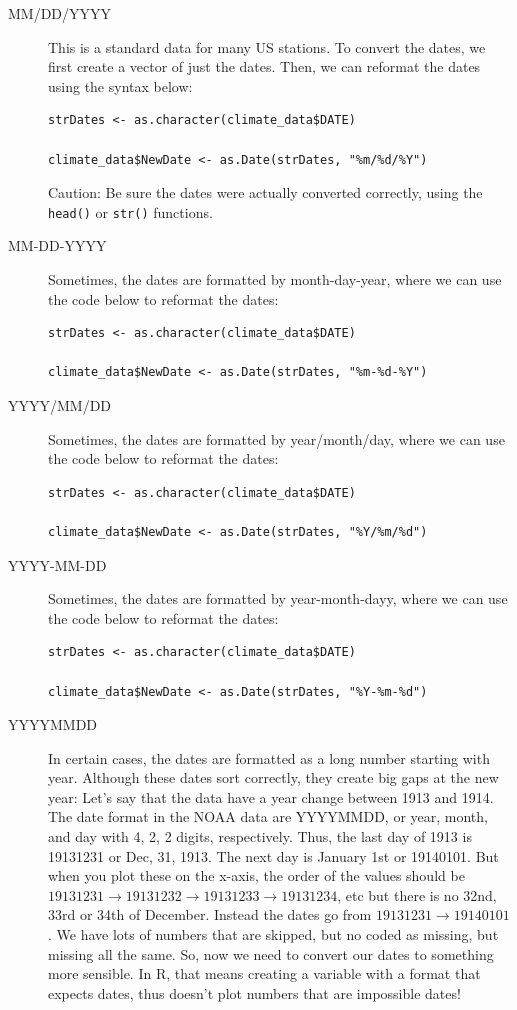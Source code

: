 \documentclass{article}\usepackage[]{graphicx}\usepackage[]{color}
\begin{document}
\begin{description}
  \item[MM/DD/YYYY] This is a standard data for many US stations. To convert the dates, we first create a vector of just the dates. Then, we can reformat the dates using the syntax below:
  
\begin{verbatim}
strDates <- as.character(climate_data$DATE)

climate_data$NewDate <- as.Date(strDates, "%m/%d/%Y")
\end{verbatim}

Caution: Be sure the dates were actually converted correctly, using the \texttt{head()} or \texttt{str()} functions.


\item[MM-DD-YYYY] Sometimes, the dates are formatted by month-day-year, where we can use the code below to reformat the dates:

\begin{verbatim}
strDates <- as.character(climate_data$DATE)

climate_data$NewDate <- as.Date(strDates, "%m-%d-%Y")
\end{verbatim}

\item[YYYY/MM/DD] Sometimes, the dates are formatted by year/month/day, where we can use the code below to reformat the dates:

  
\begin{verbatim}
strDates <- as.character(climate_data$DATE)

climate_data$NewDate <- as.Date(strDates, "%Y/%m/%d")
\end{verbatim}

\item[YYYY-MM-DD] Sometimes, the dates are formatted by year-month-dayy, where we can use the code below to reformat the dates:

  
\begin{verbatim}
strDates <- as.character(climate_data$DATE)

climate_data$NewDate <- as.Date(strDates, "%Y-%m-%d")
\end{verbatim}

\item[YYYYMMDD] In certain cases, the dates are formatted as a long number starting with year. Although these dates sort correctly, they create big gaps at the new year: Let's say that the data have a year change between 1913 and 1914. The date format in the NOAA data are YYYYMMDD, or year, month, and day with 4, 2, 2 digits, respectively. Thus, the last day of 1913 is 19131231 or Dec, 31, 1913. The next day is January 1st or 19140101. But when you plot these on the x-axis, the order of the values should be $19131231 \rightarrow 19131232 \rightarrow 19131233 \rightarrow 19131234$, etc but there is no 32nd, 33rd or 34th of December. Instead the dates go from  $19131231 \rightarrow 19140101$. We have lots of numbers that are skipped, but no coded as missing, but missing all the same. So, now we need to convert our dates to something more sensible. In R, that means creating a variable with a format that expects dates, thus doesn't plot numbers that are impossible dates!
  

\end{description}
\end{document}
